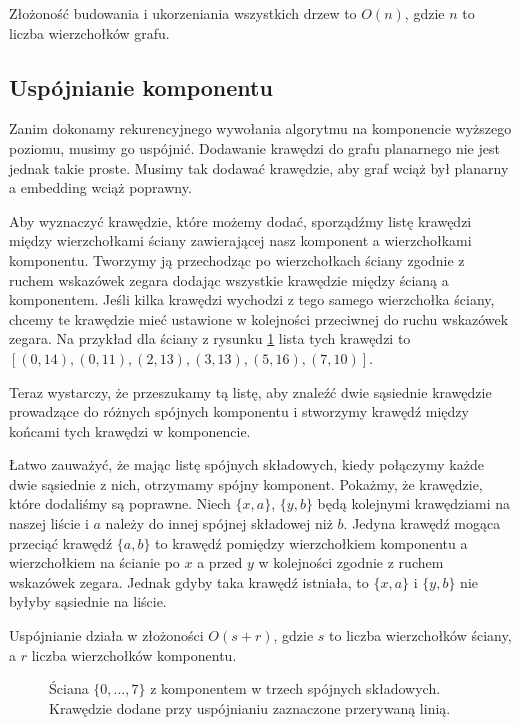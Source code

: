 \documentclass[twoside,a4paper,12pt]{report} %
\theoremstyle{break}
\begin{document}
Złożoność budowania i ukorzeniania wszystkich drzew to $O(n)$, gdzie $n$ to liczba wierzchołków grafu.



\subsection{Uspójnianie komponentu} \label{sec.uspojnianie}
Zanim dokonamy rekurencyjnego wywołania algorytmu na komponencie wyższego poziomu, musimy go uspójnić. Dodawanie krawędzi do grafu planarnego nie jest jednak takie proste. Musimy tak dodawać krawędzie, aby graf wciąż był planarny a embedding wciąż poprawny. 

Aby wyznaczyć krawędzie, które możemy dodać, sporządźmy listę krawędzi między wierzchołkami ściany zawierającej nasz komponent a wierzchołkami komponentu. Tworzymy ją przechodząc po wierzchołkach ściany zgodnie z ruchem wskazówek zegara dodając wszystkie krawędzie między ścianą a komponentem. Jeśli kilka krawędzi wychodzi z tego samego wierzchołka ściany, chcemy te krawędzie mieć ustawione w kolejności przeciwnej do ruchu wskazówek zegara. Na przykład dla ściany z rysunku \ref{uspojnianie} lista tych krawędzi to $[(0,14),(0,11),(2,13),(3,13),(5,16),(7,10)]$.

Teraz wystarczy, że przeszukamy tą listę, aby znaleźć dwie sąsiednie krawędzie prowadzące do różnych spójnych komponentu i stworzymy krawędź między końcami tych krawędzi w komponencie.

Łatwo zauważyć, że mając listę spójnych składowych, kiedy połączymy każde dwie sąsiednie z nich, otrzymamy spójny komponent. Pokażmy, że krawędzie, które dodaliśmy są poprawne. Niech $\{x, a\}$, $\{y, b\}$ będą kolejnymi krawędziami na naszej liście i $a$ należy do innej spójnej składowej niż $b$. Jedyna krawędź mogąca przeciąć krawędź $\{a,b\}$ to krawędź pomiędzy wierzchołkiem komponentu a wierzchołkiem na ścianie po $x$ a przed $y$ w kolejności zgodnie z ruchem wskazówek zegara. Jednak gdyby taka krawędź istniała, to $\{x,a\}$ i $\{y,b\}$ nie byłyby sąsiednie na liście.

Uspójnianie działa w złożoności $O(s+r)$, gdzie $s$ to liczba wierzchołków ściany, a $r$ liczba wierzchołków komponentu.

\begin{figure}[ht]
    \centering
    
    \caption{Ściana $\{0,\dots,7\}$ z komponentem w trzech spójnych składowych. Krawędzie dodane przy uspójnianiu zaznaczone przerywaną linią.}
    \label{uspojnianie}
\end{figure}
\end{document}
